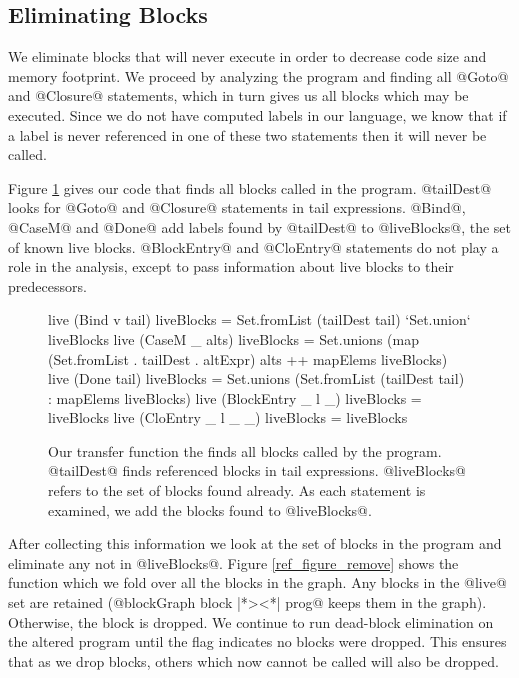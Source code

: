 \documentclass[12pt]{report}
\begin{document}
\subsection{Eliminating Blocks}

We eliminate blocks that will never execute in order to decrease code
size and memory footprint. We proceed by analyzing the program and
finding all @Goto@ and @Closure@ statements, which in turn gives us
all blocks which may be executed. Since we do not have computed
labels in our language, we know that if a label is never referenced in
one of these two statements then it will never be called.

Figure \ref{ref_figure_liveBlocks} gives our code that finds all
blocks called in the program. @tailDest@ looks for @Goto@ and
@Closure@ statements in tail expressions. @Bind@, @CaseM@ and @Done@
add labels found by @tailDest@ to @liveBlocks@, the set of known live
blocks. @BlockEntry@ and @CloEntry@ statements do not play a role in
the analysis, except to pass information about live blocks to their
predecessors.

\begin{figure}[h]
\begin{code}
live (Bind v tail) liveBlocks =
  Set.fromList (tailDest tail) `Set.union` liveBlocks
live (CaseM _ alts) liveBlocks =
  Set.unions (map (Set.fromList . tailDest . altExpr) alts
    ++ mapElems liveBlocks)
live (Done tail) liveBlocks =
  Set.unions (Set.fromList (tailDest tail)
    : mapElems liveBlocks)
live (BlockEntry _ l _) liveBlocks = liveBlocks
live (CloEntry _ l _ _) liveBlocks = liveBlocks
\end{code}
\caption{Our transfer function the finds all blocks called by the
  program. @tailDest@ finds referenced blocks in tail
  expressions. @liveBlocks@ refers to the set of blocks found
  already. As each statement is examined, we add the blocks found
  to @liveBlocks@.}
\label{ref_figure_liveBlocks}
\end{figure}

After collecting this information we look at the set of blocks in the
program and eliminate any not in @liveBlocks@. Figure
\ref{ref_figure_remove} shows the function which we fold over all the
blocks in the graph. Any blocks in the @live@ set are retained
(@blockGraph block |*><*| prog@ keeps them in the graph). Otherwise,
the block is dropped. We continue to run dead-block elimination on the
altered program until the flag indicates no blocks were dropped. This ensures
that as we drop blocks, others which now cannot be called will also be dropped.
\end{document}
